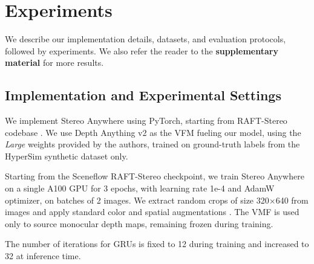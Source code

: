 \documentclass[10pt,twocolumn,letterpaper]{article}
\newcommand{\method}[0]{Stereo Anywhere\xspace}
\begin{document}
\begin{figure*}[t]
    \caption{\textbf{Qualitative Results -- Zero-Shot Generalization.} Predictions by state-of-the-art models and \method.}
    \label{fig:qual_zeroshot}\vspace{-0.3cm}

\end{figure*}


\phantom{Invisible Text}
\vspace{-\baselineskip}

\section{Experiments}

\label{sec:experiments}

We describe our implementation details, datasets, and evaluation protocols, followed by experiments. We also refer the reader to the \textbf{supplementary material} for more results.


\phantom{Invisible Text}
\vspace{-\baselineskip}

\subsection{Implementation and Experimental Settings}


We implement \method using PyTorch, starting from RAFT-Stereo codebase \cite{lipson2021raft}.
We use Depth Anything v2 \cite{depth_anything_v2} as the VFM fueling our model, using the \textit{Large} weights provided by the authors, trained on ground-truth labels from the HyperSim synthetic dataset \cite{roberts2021} only.

Starting from the Sceneflow RAFT-Stereo checkpoint, we train \method on a single A100 GPU for 3 epochs, with learning rate 1e-4 and AdamW optimizer, on batches of 2 images. We extract random crops of size 320$\times$640 from images and apply standard color and spatial augmentations \cite{lipson2021raft}.
The VMF is used only to source monocular depth maps, remaining frozen during training.

The number of iterations for GRUs is fixed to 12 during training and increased to 32 at inference time.
\end{document}
